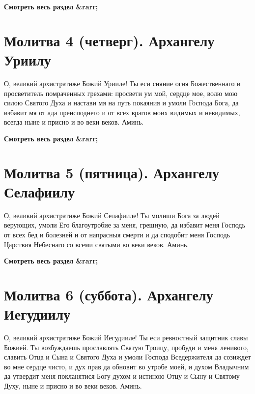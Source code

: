\bfseries Смотреть весь раздел &rarr;\normalfont{} 

\section{Молитва 4 (четверг).    Архангелу Уриилу}
 


О, великий архистратиже Божий Урииле! Ты еси сияние огня Божественнаго и просветитель помраченных грехами: просвети ум мой, сердце мое, волю мою силою Святого Духа и настави мя на путь покаяния и умоли Господа Бога, да избавит мя от ада преисподнего и от всех врагов моих видимых и невидимых, всегда ныне и присно и во веки веков. Аминь.


\mychapterending


\bfseries Смотреть весь раздел &rarr;\normalfont{} 

\section{Молитва 5 (пятница).    Архангелу Селафиилу}
 


О, великий архистратиже Божий Селафииле! Ты молиши Бога за людей верующих, умоли Его благоутробие за меня, грешную, да избавит меня Господь от всех бед и болезней и от напрасныя смерти и да сподобит меня Господь Царствия Небеснаго со всеми святыми во веки веков. Аминь.


\mychapterending


\bfseries Смотреть весь раздел &rarr;\normalfont{} 

\section{Молитва 6 (суббота).   Архангелу Иегудиилу}
 


О, великий архистратиже Божий Иегудииле! Ты еси ревностный защитник славы Божией. Ты возбуждаешь прославлять Святую Троицу, пробуди и меня ленивого, славить Отца и Сына и Святого Духа и умоли Господа Вседержителя да созиждет во мне сердце чисто, и дух прав да обновит во утробе моей, и духом Владычним да утвердит меня покланятися Богу духом и истиною Отцу и Сыну и Святому Духу, ныне и присно и во веки веков. Аминь.


